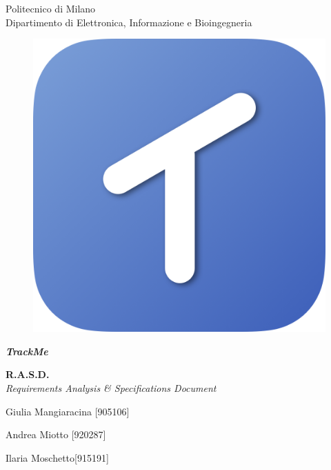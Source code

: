 \thispagestyle{empty}

\begin{center}

	\Huge Politecnico di Milano  \\   	\vspace{14pt}
    \Large Dipartimento di Elettronica, Informazione e Bioingegneria
    
    \vspace{30pt}
    
      \begin{figure}[h]
      	\centering
        \includegraphics[scale=0.25]{Pictures/Icon.png}
      \end{figure}
    
    \vspace{25pt}
    
    \Huge \textbf{\emph{TrackMe}} 
    \\
    \vspace{12pt}
    
   
    \huge \textbf{R.A.S.D.} \\
    \vspace{7pt}
    \Large \emph{Requirements Analysis \& Specifications Document} \\
    
    \vspace{110pt}
    
    \large Giulia Mangiaracina [905106]\\
    
    \vspace{5pt}
    
    \large Andrea Miotto [920287]\\
    
    \vspace{5pt}
    
    \large Ilaria Moschetto[915191]
    
    
\end{center}